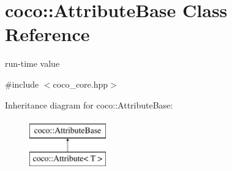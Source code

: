 \hypertarget{classcoco_1_1_attribute_base}{}\section{coco\+:\+:Attribute\+Base Class Reference}
\label{classcoco_1_1_attribute_base}


run-\/time value  




{\ttfamily \#include $<$coco\+\_\+core.\+hpp$>$}

Inheritance diagram for coco\+:\+:Attribute\+Base\+:\begin{figure}[H]
\begin{center}
\leavevmode
\includegraphics[height=2.000000cm]{classcoco_1_1_attribute_base}
\end{center}
\end{figure}
